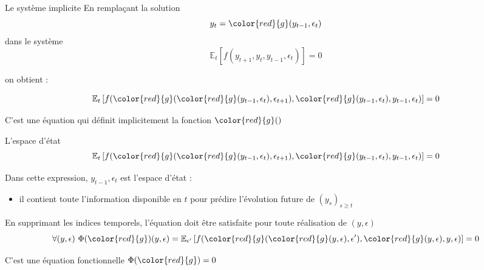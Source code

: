 \documentclass[
  ignorenonframetext,
]{beamer}
\providecommand{\tightlist}{%
  \setlength{\itemsep}{0pt}\setlength{\parskip}{0pt}}
\begin{document}
\begin{frame}{Le système implicite}
\label{le-systuxe8me-implicite}
En remplaçant la solution \[y_t = \color{red}{g}(y_{t-1},\epsilon_t)\]
dans le système
\[\mathbb{E}_t \left[ f(y_{t+1}, y_t, y_{t-1}, \epsilon_t) \right]= 0\]

on obtient :

\[\mathbb{E}_t \left[ f(\color{red}{g}(\color{red}{g}(y_{t-1},\epsilon_{t}),\epsilon_{t+1}), \color{red}{g}(y_{t-1},\epsilon_t), y_{t-1}, \epsilon_t) \right]= 0\]

C'est une équation qui définit implicitement la fonction
\(\color{red}{g}()\)
\end{frame}

\begin{frame}{L'espace d'état}
\label{lespace-duxe9tat}
\[\mathbb{E}_t \left[ f(\color{red}{g}(\color{red}{g}(y_{t-1},\epsilon_{t}),\epsilon_{t+1}), \color{red}{g}(y_{t-1},\epsilon_t), y_{t-1}, \epsilon_t) \right]= 0\]

Dans cette expression, \(y_{t-1},\epsilon_t\) est l'espace d'état :

\begin{itemize}
\tightlist
\item
  il contient toute l'information disponible en \(t\) pour prédire
  l'évolution future de \((y_s)_{s\geq t}\)
\end{itemize}

\pause

En supprimant les indices temporels, l'équation doit être satisfaite
pour toute réalisation de \((y,\epsilon)\)
\[\forall (y,\epsilon)\  \Phi(\color{red}{g})(y,\epsilon) = \mathbb{E}_{\epsilon'} \left[ f(\color{red}{g}(\color{red}{g}(y,\epsilon),\epsilon'), \color{red}{g}(y,\epsilon), y, \epsilon) \right]= 0\]

C'est une équation fonctionnelle \(\Phi(\color{red}{g})=0\)
\end{frame}
\end{document}
